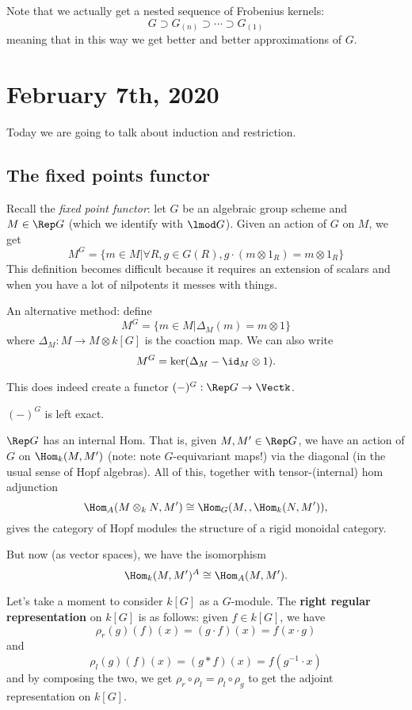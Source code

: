 \documentclass[12pt]{article}
\begin{document}
Note that we actually get a nested sequence of Frobenius kernels:
\[G\supset G_{(n)}\supset\cdots\supset G_{(1)}\]
meaning that in this way we get better and better approximations of $G$.

\section{February 7th, 2020}
Today we are going to talk about induction and restriction.
\subsection{The fixed points functor}
Recall the \textit{fixed point functor}: let $G$ be an algebraic group scheme and $M\in\Rep G$ (which we identify with $\lmod G$).
Given an action of $G$ on $M$, we get 
\[M^G=\{m\in M|\forall R, g\in G(R), g\cdot(m\otimes 1_R)=m\otimes 1_R\}\]
This definition becomes difficult because it requires an extension of scalars and when you have a lot of nilpotents it messes with things.

An alternative method: define 
\[M^G=\{m\in M|\Delta_M(m)=m\otimes 1\}\]
where $\Delta_M:M\to M\otimes k[G]$ is the coaction map. We can also write 
\[M^G=\ker(\Delta_M-\id_M\otimes 1).\]

This does indeed create a functor $(-)^G:\Rep G\to \Vectk$.
\begin{prop}
	$(-)^G$ is left exact.
\end{prop}
\begin{rmk}
	$\Rep G$ has an internal Hom. That is, given $M,M'\in\Rep G$, we have an action of $G$ on $\Hom_k(M,M')$ (note: note $G$-equivariant maps!) via the diagonal (in the usual sense of 
	Hopf algebras). All of this, together with tensor-(internal) hom adjunction
	\[\Hom_A(M\otimes_k N, M')\cong\Hom_G(M,,\Hom_k(N,M')),\]
	gives the category of Hopf modules the structure of a rigid monoidal category.

	But now (as vector spaces), we have the isomorphism 
	\[\Hom_k(M,M')^A\cong \Hom_A(M,M').\]
\end{rmk}

Let's take a moment to consider $k[G]$ as a $G$-module. The \textbf{right regular representation} on $k[G]$
is as follows: given $f\in k[G]$, we have 
\[\rho_r(g)(f)(x)=(g\cdot f)(x)=f(x\cdot g)\]
and 
\[\rho_l(g)(f)(x)=(g\ast f)(x)=f(g^{-1}\cdot x)\]
and by composing the two, we get $\rho_r\circ\rho_l=\rho_l\circ\rho_g$ to get the adjoint representation on $k[G]$.
\end{document}
